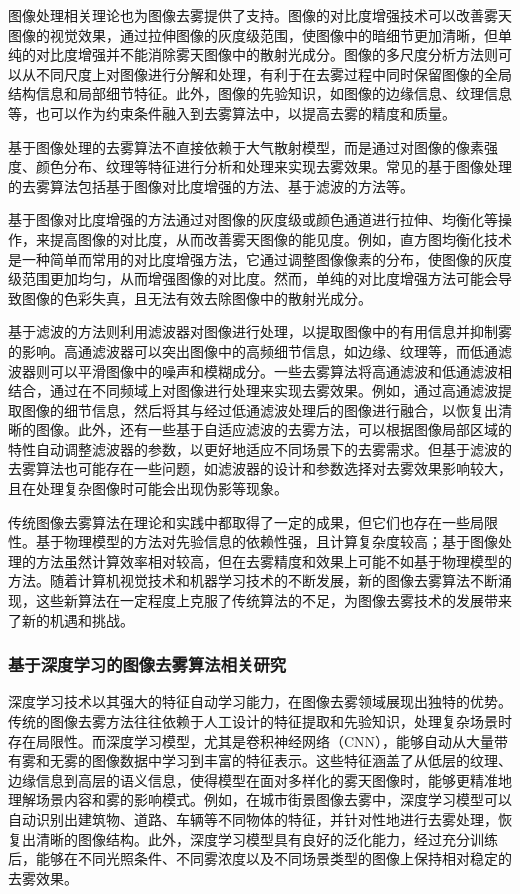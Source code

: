 图像处理相关理论也为图像去雾提供了支持。图像的对比度增强技术可以改善雾天图像的视觉效果，通过拉伸图像的灰度级范围，使图像中的暗细节更加清晰，但单纯的对比度增强并不能消除雾天图像中的散射光成分。图像的多尺度分析方法则可以从不同尺度上对图像进行分解和处理，有利于在去雾过程中同时保留图像的全局结构信息和局部细节特征。此外，图像的先验知识，如图像的边缘信息、纹理信息等，也可以作为约束条件融入到去雾算法中，以提高去雾的精度和质量。

基于图像处理的去雾算法不直接依赖于大气散射模型，而是通过对图像的像素强度、颜色分布、纹理等特征进行分析和处理来实现去雾效果。常见的基于图像处理的去雾算法包括基于图像对比度增强的方法、基于滤波的方法等。

基于图像对比度增强的方法通过对图像的灰度级或颜色通道进行拉伸、均衡化等操作，来提高图像的对比度，从而改善雾天图像的能见度。例如，直方图均衡化技术是一种简单而常用的对比度增强方法，它通过调整图像像素的分布，使图像的灰度级范围更加均匀，从而增强图像的对比度。然而，单纯的对比度增强方法可能会导致图像的色彩失真，且无法有效去除图像中的散射光成分。

基于滤波的方法则利用滤波器对图像进行处理，以提取图像中的有用信息并抑制雾的影响。高通滤波器可以突出图像中的高频细节信息，如边缘、纹理等，而低通滤波器则可以平滑图像中的噪声和模糊成分。一些去雾算法将高通滤波和低通滤波相结合，通过在不同频域上对图像进行处理来实现去雾效果。例如，通过高通滤波提取图像的细节信息，然后将其与经过低通滤波处理后的图像进行融合，以恢复出清晰的图像。此外，还有一些基于自适应滤波的去雾方法，可以根据图像局部区域的特性自动调整滤波器的参数，以更好地适应不同场景下的去雾需求。但基于滤波的去雾算法也可能存在一些问题，如滤波器的设计和参数选择对去雾效果影响较大，且在处理复杂图像时可能会出现伪影等现象。

传统图像去雾算法在理论和实践中都取得了一定的成果，但它们也存在一些局限性。基于物理模型的方法对先验信息的依赖性强，且计算复杂度较高；基于图像处理的方法虽然计算效率相对较高，但在去雾精度和效果上可能不如基于物理模型的方法。随着计算机视觉技术和机器学习技术的不断发展，新的图像去雾算法不断涌现，这些新算法在一定程度上克服了传统算法的不足，为图像去雾技术的发展带来了新的机遇和挑战。

\subsubsection{基于深度学习的图像去雾算法相关研究}

深度学习技术以其强大的特征自动学习能力，在图像去雾领域展现出独特的优势。传统的图像去雾方法往往依赖于人工设计的特征提取和先验知识，处理复杂场景时存在局限性。而深度学习模型，尤其是卷积神经网络（CNN），能够自动从大量带有雾和无雾的图像数据中学习到丰富的特征表示。这些特征涵盖了从低层的纹理、边缘信息到高层的语义信息，使得模型在面对多样化的雾天图像时，能够更精准地理解场景内容和雾的影响模式。例如，在城市街景图像去雾中，深度学习模型可以自动识别出建筑物、道路、车辆等不同物体的特征，并针对性地进行去雾处理，恢复出清晰的图像结构。此外，深度学习模型具有良好的泛化能力，经过充分训练后，能够在不同光照条件、不同雾浓度以及不同场景类型的图像上保持相对稳定的去雾效果。

